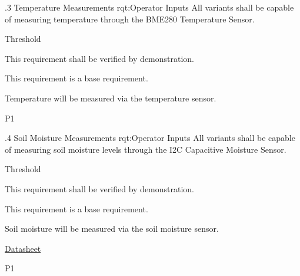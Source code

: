 \ONERQMTVKPP
{\RqtNumberBase.3}
{Temperature Measurements}
{rqt:Operator Inputs}
{All \ThisSys variants shall be capable of measuring temperature through the BME280 Temperature Sensor.}
{
	\item [All Phases] Threshold
}
{This requirement shall be verified by demonstration.}
{
	\item [N/A] This requirement is a base requirement.
}
{
  \item Temperature will be measured via the \ThisSys temperature sensor.
}
{P1}

\ONERQMTVKPP
{\RqtNumberBase.4}
{Soil Moisture Measurements}
{rqt:Operator Inputs}
{All \ThisSys variants shall be capable of measuring soil moisture levels through the I2C Capacitive Moisture Sensor.}
{
	\item [All Phases] Threshold
}
{This requirement shall be verified by demonstration.}
{
	\item [N/A] This requirement is a base requirement.
}
{
  \item Soil moisture will be measured via the \ThisSys soil moisture sensor.
  \item \href{https://learn.adafruit.com/adafruit-stemma-soil-sensor-i2c-capacitive-moisture-sensor}{Datasheet}
}
{P1}


